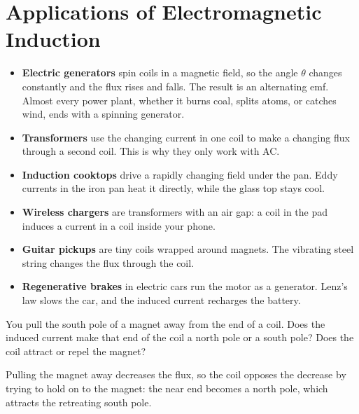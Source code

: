 \section{Applications of Electromagnetic Induction}
\begin{itemize}
    \item \textbf{Electric generators} spin coils in a magnetic field, so
          the angle $\theta$ changes constantly and the flux rises and
          falls. The result is an alternating emf. Almost every power plant,
          whether it burns coal, splits atoms, or catches wind, ends with a
          spinning generator.
    \item \textbf{Transformers} use the changing current in one coil to
          make a changing flux through a second coil. This is why they only
          work with AC.
    \item \textbf{Induction cooktops} drive a
          rapidly changing field under the pan. Eddy currents in the iron
          pan heat it directly, while the glass top stays cool.
    \item \textbf{Wireless chargers} are transformers with an air gap: a
          coil in the pad induces a current in a coil inside your phone.
    \item \textbf{Guitar pickups} are tiny coils wrapped around magnets.
          The vibrating steel string changes the flux through the coil.
    \item \textbf{Regenerative brakes} in electric cars run the motor as a
          generator. Lenz's law slows the car, and the induced current
          recharges the battery.
\end{itemize}

\begin{Exercise}[title={Which way?}, label=ind_lenz]
You pull the south pole of a magnet away from the end of a coil. Does the
induced current make that end of the coil a north pole or a south pole?
Does the coil attract or repel the magnet?
\end{Exercise}
\begin{Answer}[ref=ind_lenz]
Pulling the magnet away decreases the flux, so the coil opposes the
decrease by trying to hold on to the magnet: the near end becomes a north
pole, which attracts the retreating south pole.
\end{Answer}

